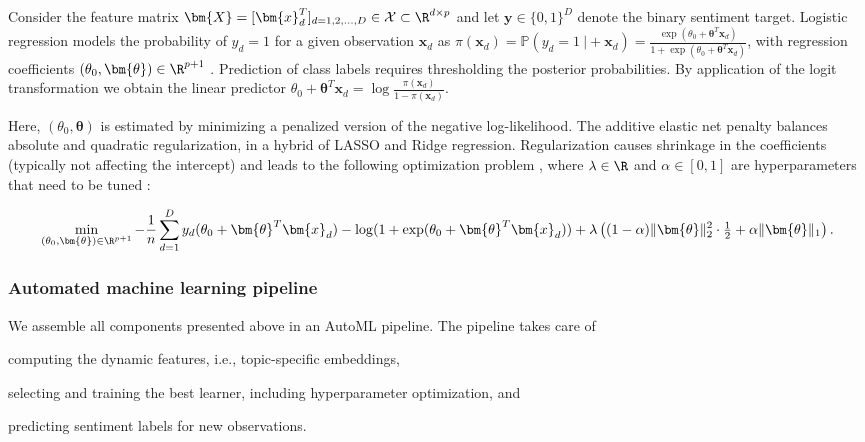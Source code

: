 Consider the feature matrix $\bm{X} = [\bm{x}_d^T]_{d = 1, 2, \dots, D} 
\in \mathcal{X} \subset \R^{d \times p}$ and let $\bm{y} \in \{0, 1\}^D$ denote 
the binary sentiment target.
Logistic regression models the probability of $y_d = 1$ for a 
given observation $\bm{x}_d$ as $\pi(\bm{x}_d) = \mathbb{P}(y_d = 1 ~ \rvert +
\bm{x}_d) = \tfrac{\exp(\theta_0 + \bm{\theta}^T\bm{x}_d)}{1 + \exp(\theta_0 +
\bm{\theta}^T\bm{x}_d)}$, with regression coefficients $(\theta_0, \bm{\theta}) 
\in \R^{p + 1}$ \citep{lindsey1997}.
Prediction of class labels requires thresholding the posterior probabilities.
By application of the logit transformation we obtain the linear 
predictor $\theta_0 + \bm{\theta}^T\bm{x}_d = \log 
\tfrac{\pi(\bm{x}_d)}{1 - \pi(\bm{x}_d)}$.

Here, $(\theta_0, \bm{\theta})$ is estimated by minimizing a penalized version 
of the negative log-likelihood.
The additive elastic net penalty balances absolute and quadratic regularization,
in a hybrid of LASSO and Ridge regression. 
Regularization causes shrinkage in the coefficients (typically not affecting the 
intercept) and leads to the following optimization problem , where 
$\lambda \in \R$ and $\alpha \in [0, 1]$ are hyperparameters that need to be 
tuned \citep{hastieetal2021}:

\begin{equation}
    \min_{(\theta_0, \bm{\theta}) \in \R^{p + 1}} - \frac{1}{n} \sum_{d = 1}^D
    y_d (\theta_0 + \bm{\theta}^T\bm{x}_d) - \log(1 + 
    \exp(\theta_0 + \bm{\theta}^T\bm{x}_d)) +
    \lambda \left( (1 - \alpha) \| \bm{\theta} \|_2^2 \cdot \tfrac{1}{2} + 
    \alpha \| \bm{\theta} \|_1 \right ).
    \label{eq_glmnet}
\end{equation}


\subsubsection{Automated machine learning pipeline}
\label{pipeline}

We assemble all components presented above in an AutoML pipeline.
The pipeline takes care of

\begin{tight_enumerate}
  \item computing the dynamic features, i.e., topic-specific embeddings,
  \item selecting and training the best learner, including hyperparameter 
  optimization, and
  \item predicting sentiment labels for new observations.
\end{tight_enumerate}

